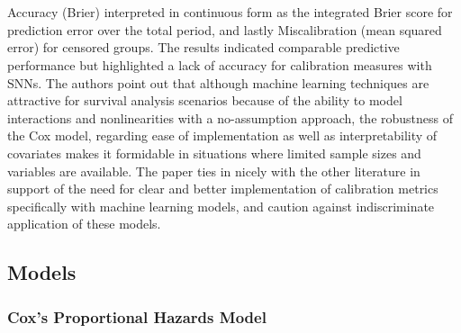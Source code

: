 \\\\
\noindent Accuracy (Brier) interpreted in continuous form as the integrated Brier score for prediction error over the total period, and lastly Miscalibration (mean squared error) for censored groups. \parencite{kantidakis_simulation_2021} The results indicated comparable predictive performance but highlighted a lack of accuracy for calibration measures with SNNs. The authors point out that although machine learning techniques are attractive for survival analysis scenarios because of the ability to model interactions and nonlinearities with a no-assumption approach, the robustness of the Cox model, regarding ease of implementation as well as interpretability of covariates makes it formidable in situations where limited sample sizes and variables are available. The paper ties in nicely with the other literature in support of the need for clear and better implementation of calibration metrics specifically with machine learning models, and caution against indiscriminate application of these models.


\subsection{Models}
\subsubsection{Cox's Proportional Hazards Model}

